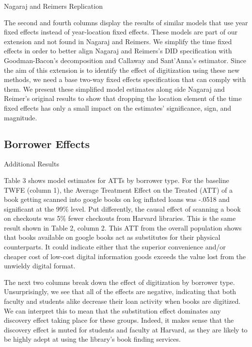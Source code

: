 \documentclass{article}
\begin{document}
\begin{table}[htbp]
   \centering
   \caption{Nagaraj and Reimers Replication}
  
   \label{tab:booktabs}
\end{table}

The second and fourth columns display the results of similar models that use year fixed effects instead of year-location fixed effects. These models are part of our extension and not found in Nagaraj and Reimers. We simplify the time fixed effects in order to better align Nagaraj and Reimers's DID specification with Goodman-Bacon's decomposition and Callaway and Sant'Anna's estimator. Since the aim of this extension is to identify the effect of digitization using these new methods, we need a base two-way fixed effects specification that can comply with them. We present these simplified model estimates along side Nagaraj and Reimer's original results to show that dropping the location element of the time fixed effects has only a small impact on the estimates' significance, sign, and magnitude.

\subsection{Borrower Effects}
\begin{table}[h]
   \centering
   \caption{Additional Results}
  
   \label{tab:booktabs}
\end{table}
Table 3 shows model estimates for ATTs by borrower type. For the baseline TWFE (column 1), the Average Treatment Effect on the Treated (ATT) of a book getting scanned into google books on log inflated loans was -.0518 and significant at the 99\% level. Put differently, the causal effect of scanning a book on checkouts was 5\% fewer checkouts from Harvard libraries. This is the same result shown in Table 2, column 2. This ATT from the overall population shows that books available on google books act as substitutes for their physical counterparts. It could indicate either that the superior convenience and/or cheaper cost of low-cost digital information goods exceeds the value lost from the unwieldy digital format. 

The next two columns break down the effect of digitization by borrower type. Unsurprisingly, we see that all of the effects are negative, indicating that both faculty and students alike decrease their loan activity when books are digitized. We can interpret this to mean that the substitution effect dominates any discovery effect taking place for these groups. Indeed, it makes sense that the discovery effect is muted for students and faculty at Harvard, as they are likely to be highly adept at using the library's book finding services. 
\end{document}
